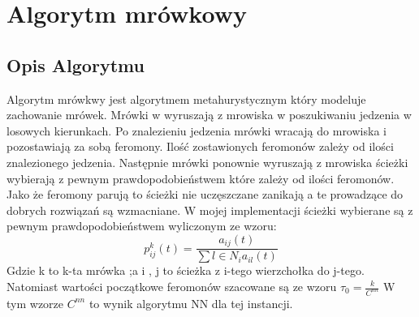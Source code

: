 \documentclass{article}
\begin{document}
    \section{Algorytm mrówkowy}
      \subsection{Opis Algorytmu}
        Algorytm mrówkwy jest algorytmem metahurystycznym który modeluje zachowanie mrówek.
        Mrówki w wyruszają z mrowiska w poszukiwaniu jedzenia w losowych kierunkach. Po 
        znalezieniu jedzenia mrówki wracają do mrowiska i pozostawiają za sobą feromony.
        Ilość zostawionych feromonów zależy od ilości znalezionego jedzenia. Następnie
        mrówki ponownie wyruszają z mrowiska ścieżki wybierają z pewnym prawdopodobieństwem
        które zależy od ilości feromonów. Jako że feromony parują to ścieżki nie uczęszczane
        zanikają a te prowadzące do dobrych rozwiązań są wzmacniane.\linebreak
        W mojej implementacji ścieżki wybierane są z pewnym prawdopodobieństwem 
        wyliczonym ze wzoru:  \[
            p_{ij}^k(t) = \frac{a_{ij}(t)}{\sum{l\in N_i}a_{il}(t)}
        \]
        Gdzie k to k-ta mrówka ;a i , j to ścieżka z i-tego wierzchołka do j-tego.
        Natomiast wartości początkowe feromonów szacowane są ze wzoru $\tau_0 = \frac{k}{C^{nn}}$
        W tym wzorze $C^{nn}$ to wynik algorytmu NN dla tej instancji.
\end{document}
